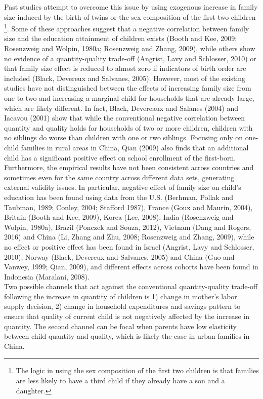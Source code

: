 \documentclass[12pt]{extarticle}
\begin{document}
\indent Past studies attempt to overcome this issue by using exogenous increase in family size induced by the birth of twins or the sex composition of the first two children \footnote{The logic in using the sex composition of the first two children is that families are less likely to have a third child if they already have a son and a daughter.}. Some of these approaches suggest that a negative correlation between family size and the education attainment of children exists (Booth and Kee, 2009; Rosenzweig and Wolpin, 1980a; Rosenzweig and Zhang, 2009), while others show no evidence of a quantity-quality trade-off (Angrist, Lavy and Schlosser, 2010) or that family size effect is reduced to almost zero if indicators of birth order are included (Black, Devereux and Salvanes, 2005). However, most of the existing studies have not distinguished between the effects of increasing family size from one to two and increasing a marginal child for households that are already large, which are likely different. In fact, Black, Devereaux and Salanes (2004) and Iacavou (2001) show that while the conventional negative correlation between quantity and quality holds for households of two or more children, children with no siblings do worse than children with one or two siblings. Focusing only on one-child families in rural areas in China, Qian (2009) also finds that an additional child has a significant positive effect on school enrollment of the first-born. \\
\indent Furthermore, the empirical results have not been consistent across countries and sometimes even for the same country across different data sets, generating external validity issues. In particular, negative effect of family size on child's education has been found using data from the U.S. (Berhman, Pollak and Taubman, 1989; Conley, 2004; Stafford 1987), France (Goux and Maurin, 2004), Britain (Booth and Kee, 2009), Korea (Lee, 2008), India (Rosenzweig and Wolpin, 1980a), Brazil (Ponczek and Souza, 2012), Vietnam (Dang and Rogers, 2016) and China (Li, Zhang and Zhu, 2008; Rosenzweig and Zhang, 2009), while no effect or positive effect has been found in Israel (Angrist, Lavy and Schlosser, 2010), Norway (Black, Devereux and Salvanes, 2005) and China (Guo and Vanwey, 1999; Qian, 2009), and different effects across cohorts have been found in Indonesia (Maralani, 2008). \\
\indent Two possible channels that act against the conventional quantity-quality trade-off following the increase in quantity of children is 1) change in mother's labor supply decision, 2) change in household expenditures and savings pattern to ensure that quality of current child is not negatively affected by the increase in quantity. The second channel can be focal when parents have low elasticity between child quantity and quality, which is likely the case in urban families in China. \\
\end{document}
